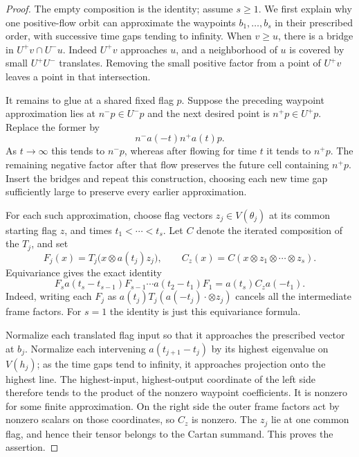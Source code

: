 \begin{proof}
The empty composition is the identity; assume $s\ge1$.
We first explain why one positive-flow orbit can approximate the
waypoints $b_1,\ldots,b_s$ in their prescribed order, with successive
time gaps tending to infinity.  When $v\ge u$, there is a bridge in
$U^+v\cap U^-u$.  Indeed $U^+v$ approaches $u$, and a neighborhood
of $u$ is covered by small $U^+U^-$ translates.  Removing the small
positive factor from a point of $U^+v$ leaves a point in that
intersection.

It remains to glue at a shared fixed flag $p$.  Suppose the preceding
waypoint approximation lies at $n^-p\in U^-p$ and the next desired
point is $n^+p\in U^+p$.  Replace the former by
\begin{equation}\label{real:gluing-point}
 n^-a(-t)n^+a(t)p.
\end{equation}
As $t\to\infty$ this tends to $n^-p$, whereas after flowing for time
$t$ it tends to $n^+p$.  The remaining negative factor after that
flow preserves the future cell containing $n^+p$.  Insert the bridges
and repeat this construction, choosing each new time gap sufficiently
large to preserve every earlier approximation.

For each such approximation, choose flag vectors $z_j\in V(\theta_j)$
at its common starting flag $z$, and times $t_1<\cdots<t_s$.
Let $C$ denote the iterated composition of the $T_j$, and set
\[
 F_j(x)=T_j\bigl(x\otimes a(t_j)z_j\bigr),\qquad
 C_z(x)=C(x\otimes z_1\otimes\cdots\otimes z_s).
\]
Equivariance gives the exact identity
\[
 F_s a(t_s-t_{s-1})F_{s-1}\cdots a(t_2-t_1)F_1
   =a(t_s)C_z a(-t_1).
\]
Indeed, writing each $F_j$ as
$a(t_j)T_j(a(-t_j){\cdot}\otimes z_j)$ cancels all the
intermediate frame factors.  For $s=1$ the identity is just this
equivariance formula.

Normalize each translated flag input so that it approaches the
prescribed vector at $b_j$.  Normalize each intervening
$a(t_{j+1}-t_j)$ by its highest eigenvalue on $V(h_j)$; as the time
gaps tend to infinity, it approaches projection onto the highest
line.  The highest-input, highest-output coordinate of the left side
therefore tends to the product of the nonzero waypoint coefficients.
It is nonzero for some finite approximation.  On the right side the
outer frame factors act by nonzero scalars on those coordinates, so
$C_z$ is nonzero.  The $z_j$ lie at one common flag, and hence their
tensor belongs to the Cartan summand.  This proves the assertion.
\end{proof}

